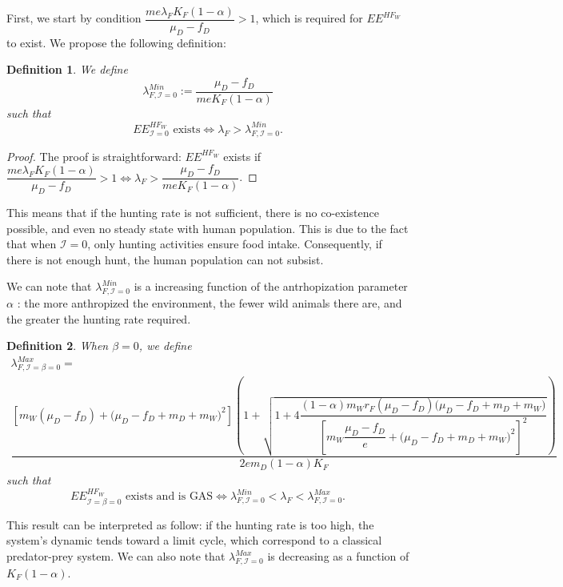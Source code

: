 \documentclass{article}
\newcommand{\lfw}{\lambda_{F}}
\newcommand{\lfw}{\lambda_{F}}
\newcommand{\cI}{\mathcal{I}}
\newtheorem{definition}{Definition}
\begin{document}
First, we start by condition $\dfrac{m e \lfw  K_F(1-\alpha)}{\mu_D - f_D} > 1$, which is required for $EE^{HF_W}$ to exist. We propose the following definition:

\begin{definition}\label{defLambdaMin, cI=0} We define 
$$\lambda_{F, \cI=0}^{Min} := \dfrac{\mu_D - f_D}{m e K_F(1-\alpha)}$$
such that 
$$
\text{$EE^{HF_W}_{\cI = 0}$ exists} \Leftrightarrow  \lfw > \lambda_{F, \cI=0}^{Min}.
$$
\end{definition}
\begin{proof}
The proof is straightforward: $EE^{HF_W}$ exists if $\dfrac{m e \lfw K_F(1-\alpha)}{\mu_D - f_D} > 1 \Leftrightarrow  \lfw> \dfrac{\mu_D - f_D}{ m e K_F(1-\alpha)} $.
\end{proof}

This means that if the hunting rate is not sufficient, there is no co-existence possible, and even no steady state with human population. This is due to the fact that when $\cI = 0$, only hunting activities ensure food intake. Consequently, if there is not enough hunt, the human population can not subsist.

We can note that $\lambda_{F, \cI=0}^{Min}$ is a increasing function of the antrhopization parameter $\alpha$ : the more anthropized the environment, the fewer wild animals there are, and the greater the hunting rate required. 

\begin{definition}
When $\beta = 0 $, we define
\begin{multline*}
\lambda_{F, \cI = \beta =0}^{Max}  = \\
\dfrac{\left[m_{W}(\mu_{D}-f_{D})+\big(\mu_{D}-f_{D}+m_{D}+m_{W})^{2}\right]\left(1+\sqrt{1+4\dfrac{(1-\alpha)m_{W}r_{F}\left(\mu_{D}-f_{D}\right)\big(\mu_{D}-f_{D}+m_{D}+m_{W})}{\left[m_{W}\dfrac{\mu_{D}-f_{D}}{e}+\big(\mu_{D}-f_{D}+m_{D}+m_{W})^{2}\right]^{2}}}\right)}{2em_D (1-\alpha) K_F }
\end{multline*}
such that $$
\text{$EE^{HF_W}_{\cI = \beta = 0}$ exists and is GAS} \Leftrightarrow \lambda_{F, \cI=0}^{Min} < \lfw < \lambda_{F, \cI =0}^{Max}
.$$
\end{definition}

This result can be interpreted as follow: if the hunting rate is too high, the system's dynamic tends toward a limit cycle, which correspond to a classical predator-prey system. We can also note that $\lambda_{F, \cI =0}^{Max} $ is decreasing as a function of $K_F(1-\alpha)$. 
\end{document}
